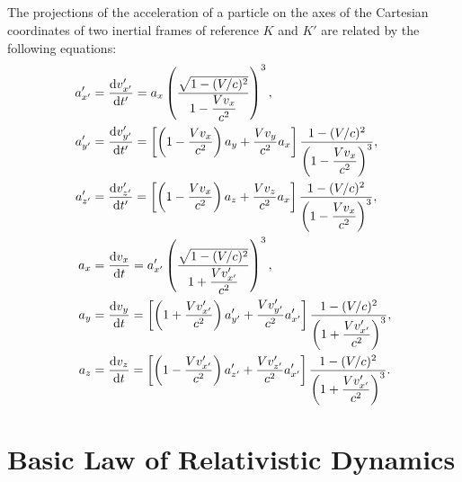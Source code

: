\subsection{}\label{5.5.4} The projections of the acceleration of a particle on the axes of the Cartesian coordinates of two inertial frames of refer­ence $K$ and $K'$  are related by the following equations:
\begin{align*}%
a_{x'}' & = \dv{v_{x'}'}{t'} = a_{x} \left( \frac{\sqrt{1 - (V/c)^{2}}}{1 - \dfrac{Vv_{x}}{c^{2}}} \right)^{3},\\
a_{y'}' & = \dv{v_{y'}'}{t'} =  \left[\left(1 - \dfrac{Vv_{x}}{c^{2}}\right)a_{y} +  \dfrac{Vv_{y}}{c^{2}}a_{x} \right] \dfrac{1 - (V/c)^{2}}{\left( 1 - \dfrac{Vv_{x}}{c^{2}} \right)^{3}},\\
a_{z'}' & = \dv{v_{z'}'}{t'} =  \left[\left(1 - \dfrac{Vv_{x}}{c^{2}}\right)a_{z} +  \dfrac{Vv_{z}}{c^{2}}a_{x} \right] \dfrac{1 - (V/c)^{2}}{\left( 1 - \dfrac{Vv_{x}}{c^{2}} \right)^{3}},\\
a_{x} & = \dv{v_{x}}{t} =  a_{x'}' \left( \frac{\sqrt{1 - (V/c)^{2}}}{1 + \dfrac{Vv_{x'}'}{c^{2}}}\right)^{3},\\
a_{y} & = \dv{v_{y}}{t} =  \left[\left(1 + \dfrac{Vv_{x'}'}{c^{2}}\right)a_{y'}' +  \dfrac{Vv_{y'}'}{c^{2}}a_{x'}' \right] \dfrac{1 - (V/c)^{2}}{\left( 1 + \dfrac{Vv_{x'}'}{c^{2}} \right)^{3}},\\
a_{z} & = \dv{v_{z}}{t} =  \left[\left(1 - \dfrac{Vv_{x'}'}{c^{2}}\right)a_{z'}' +  \dfrac{Vv_{z'}'}{c^{2}}a_{x'}' \right] \dfrac{1 - (V/c)^{2}}{\left( 1 + \dfrac{Vv_{x'}'}{c^{2}} \right)^{3}}.\\
\end{align*}
\clearpage

\section{Basic Law of Relativistic Dynamics}
\label{sec-5.6}

